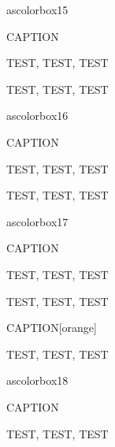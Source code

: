 ascolorbox15

\begin{ascolorbox15}{CAPTION}

TEST, TEST, TEST

\end{ascolorbox15}

\begin{ascolorbox15}{}

TEST, TEST, TEST

\end{ascolorbox15}

ascolorbox16

\begin{ascolorbox16}{CAPTION}

TEST, TEST, TEST

\end{ascolorbox16}

\begin{ascolorbox16}{}

TEST, TEST, TEST

\end{ascolorbox16}

ascolorbox17

\begin{ascolorbox17}{CAPTION}

TEST, TEST, TEST

\end{ascolorbox17}

\begin{ascolorbox17}{}

TEST, TEST, TEST

\end{ascolorbox17}

\begin{ascolorbox17}{CAPTION}[orange]

TEST, TEST, TEST

\end{ascolorbox17}

ascolorbox18

\begin{ascolorbox18}{CAPTION}

TEST, TEST, TEST

\end{ascolorbox18}

